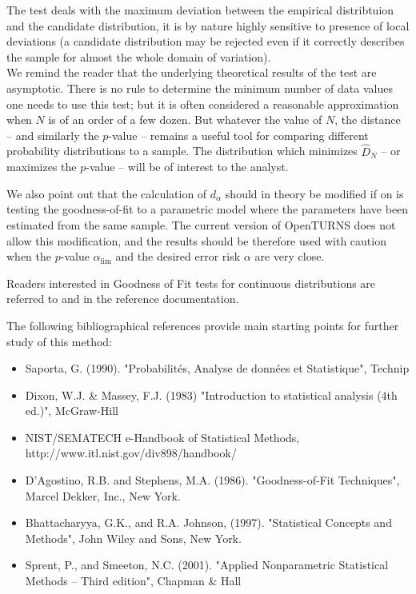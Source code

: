 {
  The test deals with the maximum deviation between the empirical distribtuion and the candidate distribution, it is by nature highly sensitive to presence of local deviations (a candidate distribution may be rejected even if it correctly describes the sample for almost the whole domain of variation).\\

  We remind the reader that the underlying theoretical results of the test are asymptotic. There is no rule to determine the minimum number of data values one needs to use this test; but it is often considered a reasonable approximation when $N$ is of an order of a few dozen. But whatever the value of $N$, the distance -- and similarly the $p$-value -- remains a useful tool for comparing different probability distributions to a sample. The distribution which minimizes $\widehat{D}_N$ -- or maximizes the $p$-value -- will be of interest to the analyst.

  We also point out that the calculation of $d_\alpha$ should in theory be modified if on is testing the goodness-of-fit to a parametric model where the parameters have been estimated from the same sample. The current version of OpenTURNS does not allow this modification, and the results should be therefore used with caution when the $p$-value $\alpha_\textrm{lim}$ and the desired error risk $\alpha$ are very close.

  Readers interested in Goodness of Fit tests for continuous distributions are referred to  and  in the reference documentation.

  The following bibliographical references provide main starting points for further study of this method:
  \begin{itemize}
  \item Saporta, G. (1990). "Probabilités, Analyse de données et Statistique", Technip
  \item Dixon, W.J. \& Massey, F.J. (1983) "Introduction to statistical analysis (4th ed.)", McGraw-Hill
  \item NIST/SEMATECH e-Handbook of Statistical Methods, http://www.itl.nist.gov/div898/handbook/
  \item D'Agostino, R.B. and Stephens, M.A. (1986). "Goodness-of-Fit Techniques", Marcel Dekker, Inc., New York.
  \item Bhattacharyya, G.K., and R.A. Johnson, (1997). "Statistical Concepts and Methods", John Wiley and Sons, New York.
  \item Sprent, P., and Smeeton, N.C. (2001). "Applied Nonparametric Statistical Methods -- Third edition", Chapman \& Hall
  \end{itemize}
}
